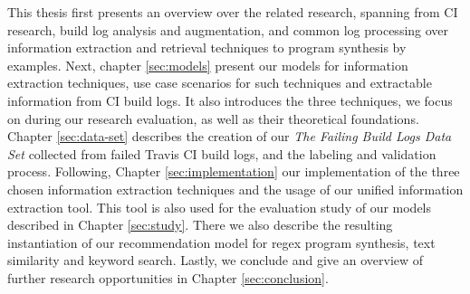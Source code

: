 \documentclass[\myrootdir/main.tex]{subfiles}
\begin{document}
This thesis first presents an overview over the related research, spanning from CI research, build log analysis and augmentation, and common  log processing over information extraction and retrieval techniques to program synthesis by examples.
Next, chapter \ref{sec:models} present our models for information extraction techniques, use case scenarios for such techniques and extractable information from CI build logs. It also introduces the three techniques, we focus on during our research evaluation, as well as their theoretical foundations.
Chapter \ref{sec:data-set} describes the creation of our \emph{The Failing Build Logs Data Set} collected from failed Travis CI build logs, and the labeling and validation process.
Following, Chapter \ref{sec:implementation} our implementation of the three chosen information extraction techniques and the usage of our unified information extraction tool.
This tool is also used for the evaluation study of our models described in Chapter \ref{sec:study}. There we also describe the resulting instantiation of our recommendation model for regex program synthesis, text similarity and keyword search.
Lastly, we conclude and give an overview of further research opportunities in Chapter \ref{sec:conclusion}.
\end{document}
